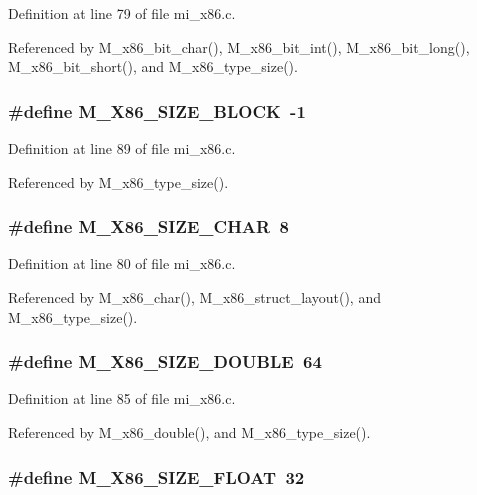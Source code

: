 Definition at line 79 of file mi\_\-x86.c.

Referenced by M\_\-x86\_\-bit\_\-char(), M\_\-x86\_\-bit\_\-int(), M\_\-x86\_\-bit\_\-long(), M\_\-x86\_\-bit\_\-short(), and M\_\-x86\_\-type\_\-size().
\subsubsection{\setlength{\rightskip}{0pt plus 5cm}\#define M\_\-X86\_\-SIZE\_\-BLOCK~-1}\label{mi__x86_8c_a9139669b79d9b440027d9dabb4be72c}




Definition at line 89 of file mi\_\-x86.c.

Referenced by M\_\-x86\_\-type\_\-size().
\subsubsection{\setlength{\rightskip}{0pt plus 5cm}\#define M\_\-X86\_\-SIZE\_\-CHAR~8}\label{mi__x86_8c_fad43b7d4c2fc975fae1c51bf20fb71b}




Definition at line 80 of file mi\_\-x86.c.

Referenced by M\_\-x86\_\-char(), M\_\-x86\_\-struct\_\-layout(), and M\_\-x86\_\-type\_\-size().
\subsubsection{\setlength{\rightskip}{0pt plus 5cm}\#define M\_\-X86\_\-SIZE\_\-DOUBLE~64}\label{mi__x86_8c_408dd8135a7c354d92b8bdf9c79db77d}




Definition at line 85 of file mi\_\-x86.c.

Referenced by M\_\-x86\_\-double(), and M\_\-x86\_\-type\_\-size().
\subsubsection{\setlength{\rightskip}{0pt plus 5cm}\#define M\_\-X86\_\-SIZE\_\-FLOAT~32}\label{mi__x86_8c_b6bd244173e8a184d7ffd00345d104c9}




